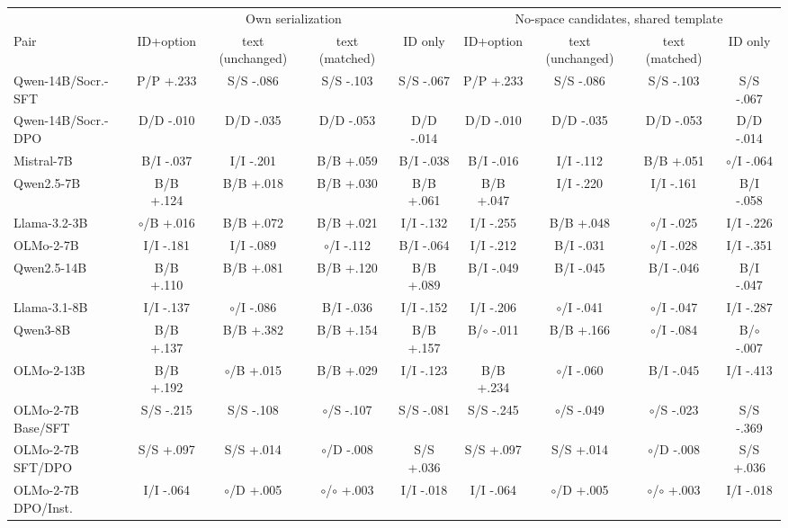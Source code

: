 \begin{table}[t]
\centering\scriptsize
\setlength{\tabcolsep}{3pt}
\begin{tabular}{@{}lcccccccc@{}}
\toprule
& \multicolumn{4}{c}{Own serialization} & \multicolumn{4}{c}{No-space candidates, shared template} \\
\cmidrule(lr){2-5}\cmidrule(l){6-9}
Pair & ID+option & text (unchanged) & text (matched) & ID only & ID+option & text (unchanged) & text (matched) & ID only \\
\midrule
Qwen-14B/Socr.-SFT & P/P +.233 & S/S -.086 & S/S -.103 & S/S -.067 & P/P +.233 & S/S -.086 & S/S -.103 & S/S -.067 \\
Qwen-14B/Socr.-DPO & D/D -.010 & D/D -.035 & D/D -.053 & D/D -.014 & D/D -.010 & D/D -.035 & D/D -.053 & D/D -.014 \\
\addlinespace[2pt]
Mistral-7B & B/I -.037 & I/I -.201 & B/B +.059 & B/I -.038 & B/I -.016 & I/I -.112 & B/B +.051 & $\circ$/I -.064 \\
Qwen2.5-7B & B/B +.124 & B/B +.018 & B/B +.030 & B/B +.061 & B/B +.047 & I/I -.220 & I/I -.161 & B/I -.058 \\
Llama-3.2-3B & $\circ$/B +.016 & B/B +.072 & B/B +.021 & I/I -.132 & I/I -.255 & B/B +.048 & $\circ$/I -.025 & I/I -.226 \\
OLMo-2-7B & I/I -.181 & I/I -.089 & $\circ$/I -.112 & B/I -.064 & I/I -.212 & B/I -.031 & $\circ$/I -.028 & I/I -.351 \\
\addlinespace[2pt]
Qwen2.5-14B & B/B +.110 & B/B +.081 & B/B +.120 & B/B +.089 & B/I -.049 & B/I -.045 & B/I -.046 & B/I -.047 \\
Llama-3.1-8B & I/I -.137 & $\circ$/I -.086 & B/I -.036 & I/I -.152 & I/I -.206 & $\circ$/I -.041 & $\circ$/I -.047 & I/I -.287 \\
Qwen3-8B & B/B +.137 & B/B +.382 & B/B +.154 & B/B +.157 & B/$\circ$ -.011 & B/B +.166 & $\circ$/I -.084 & B/$\circ$ -.007 \\
OLMo-2-13B & B/B +.192 & $\circ$/B +.015 & B/B +.029 & I/I -.123 & B/B +.234 & $\circ$/I -.060 & B/I -.045 & I/I -.413 \\
\addlinespace[2pt]
OLMo-2-7B Base/SFT & S/S -.215 & S/S -.108 & $\circ$/S -.107 & S/S -.081 & S/S -.245 & $\circ$/S -.049 & $\circ$/S -.023 & S/S -.369 \\
OLMo-2-7B SFT/DPO & S/S +.097 & S/S +.014 & $\circ$/D -.008 & S/S +.036 & S/S +.097 & S/S +.014 & $\circ$/D -.008 & S/S +.036 \\
OLMo-2-7B DPO/Inst. & I/I -.064 & $\circ$/D +.005 & $\circ$/$\circ$ +.003 & I/I -.018 & I/I -.064 & $\circ$/D +.005 & $\circ$/$\circ$ +.003 & I/I -.018 \\

\end{tabular}
\end{table}
